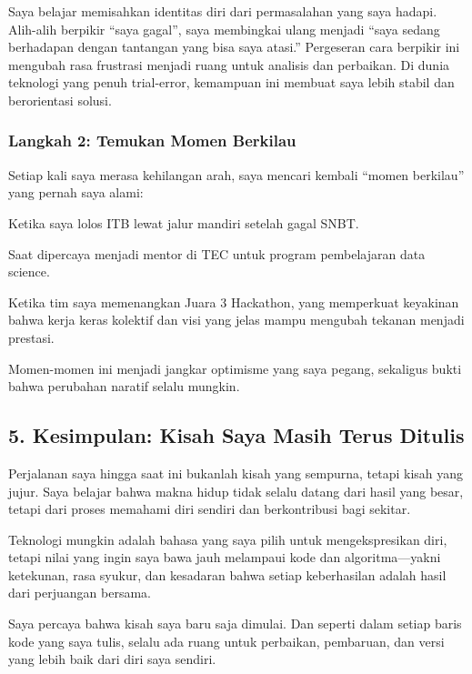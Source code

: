 \documentclass[
  letterpaper,
  DIV=11,
  numbers=noendperiod]{scrreprt}
\begin{document}
Saya belajar memisahkan identitas diri dari permasalahan yang saya
hadapi. Alih-alih berpikir ``saya gagal'', saya membingkai ulang menjadi
``saya sedang berhadapan dengan tantangan yang bisa saya atasi.''
Pergeseran cara berpikir ini mengubah rasa frustrasi menjadi ruang untuk
analisis dan perbaikan. Di dunia teknologi yang penuh trial-error,
kemampuan ini membuat saya lebih stabil dan berorientasi solusi.

\subsubsection{Langkah 2: Temukan Momen
Berkilau}\label{langkah-2-temukan-momen-berkilau}

Setiap kali saya merasa kehilangan arah, saya mencari kembali ``momen
berkilau'' yang pernah saya alami:

Ketika saya lolos ITB lewat jalur mandiri setelah gagal SNBT.

Saat dipercaya menjadi mentor di TEC untuk program pembelajaran data
science.

Ketika tim saya memenangkan Juara 3 Hackathon, yang memperkuat keyakinan
bahwa kerja keras kolektif dan visi yang jelas mampu mengubah tekanan
menjadi prestasi.

Momen-momen ini menjadi jangkar optimisme yang saya pegang, sekaligus
bukti bahwa perubahan naratif selalu mungkin.

\subsection{\texorpdfstring{\textbf{5. Kesimpulan: Kisah Saya Masih
Terus
Ditulis}}{5. Kesimpulan: Kisah Saya Masih Terus Ditulis}}\label{kesimpulan-kisah-saya-masih-terus-ditulis}

Perjalanan saya hingga saat ini bukanlah kisah yang sempurna, tetapi
kisah yang jujur. Saya belajar bahwa makna hidup tidak selalu datang
dari hasil yang besar, tetapi dari proses memahami diri sendiri dan
berkontribusi bagi sekitar.

Teknologi mungkin adalah bahasa yang saya pilih untuk mengekspresikan
diri, tetapi nilai yang ingin saya bawa jauh melampaui kode dan
algoritma---yakni ketekunan, rasa syukur, dan kesadaran bahwa setiap
keberhasilan adalah hasil dari perjuangan bersama.

Saya percaya bahwa kisah saya baru saja dimulai. Dan seperti dalam
setiap baris kode yang saya tulis, selalu ada ruang untuk perbaikan,
pembaruan, dan versi yang lebih baik dari diri saya sendiri.
\end{document}
